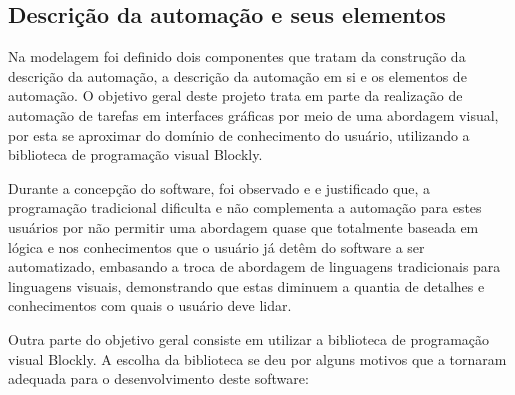 \documentclass[tg]{mdtufsm}
\begin{document}
            \subsection {Descrição da automação e seus elementos}

                Na modelagem foi definido dois componentes que tratam da construção da descrição da automação, a descrição da automação em si e os elementos de automação. O objetivo geral deste projeto trata em parte da realização de automação de tarefas em interfaces gráficas por meio de uma abordagem visual, por esta se aproximar do domínio de conhecimento do usuário, utilizando a biblioteca de programação visual Blockly.

                Durante a concepção do software, foi observado e e justificado que, a programação tradicional dificulta e não complementa a automação para estes usuários por não permitir uma abordagem quase que totalmente baseada em lógica e nos conhecimentos que o usuário já detêm do software a ser automatizado, embasando a troca de abordagem de linguagens tradicionais para linguagens visuais, demonstrando que estas diminuem a quantia de detalhes e conhecimentos com quais o usuário deve lidar.

                Outra parte do objetivo geral consiste em utilizar a biblioteca de programação visual Blockly. A escolha da biblioteca se deu por alguns motivos que a tornaram adequada para o desenvolvimento deste software:
\end{document}
